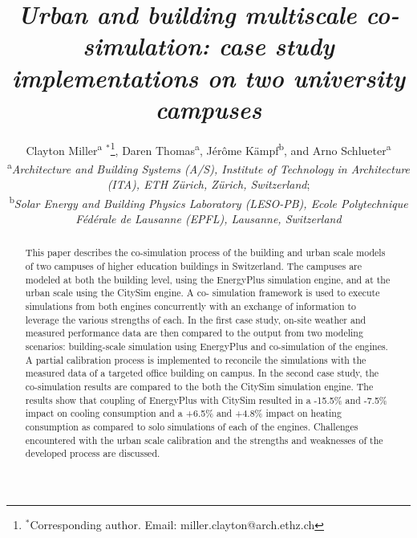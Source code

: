 \documentclass{tBPS2e}
\theoremstyle{plain}
\theoremstyle{definition}
\theoremstyle{remark}
\begin{document}


\title{\textit{Urban and building multiscale co-simulation: case study implementations on two university campuses}}

\author{Clayton Miller\textsuperscript{a}%
$^{\ast}$\thanks{$^\ast$Corresponding author. Email: miller.clayton@arch.ethz.ch}, 
Daren Thomas\textsuperscript{a},
J\'er\^ome K\"ampf\textsuperscript{b},
and Arno Schlueter\textsuperscript{a}\\
\vspace{6pt}
\textsuperscript{a}{\em Architecture and Building Systems (A/S), Institute of Technology in Architecture (ITA), ETH Z\"urich, Z\"urich, Switzerland};\\
\textsuperscript{b}{\em Solar Energy and Building Physics Laboratory (LESO-PB), Ecole Polytechnique F\'ed\'erale de Lausanne (EPFL), Lausanne, Switzerland}
}

\maketitle

\begin{abstract}
    This paper describes the co-simulation process of the building and urban
    scale models of two campuses of higher education buildings in Switzerland.
    The campuses are modeled at both the building level, using the EnergyPlus
    simulation engine, and at the urban scale using the CitySim engine. A co-
    simulation framework is used to execute simulations from both engines
    concurrently with an exchange of information to leverage the various
    strengths of each. In the first case study, on-site weather and measured
    performance data are then compared to the output from two modeling
    scenarios: building-scale simulation using EnergyPlus and co-simulation of
    the engines. A partial calibration process is implemented to reconcile the
    simulations with the measured data of a targeted office building on
    campus. In the second case study, the co-simulation results are compared
    to the both the CitySim simulation engine. The results
    show that coupling of EnergyPlus with CitySim resulted in a -15.5\% and
    -7.5\% impact on cooling consumption and a +6.5\% and +4.8\% impact on
    heating consumption as compared to solo simulations of each of the engines. Challenges encountered with the urban scale
    calibration and the strengths and weaknesses of the developed process are
    discussed.
\end{abstract}
\end{document}
